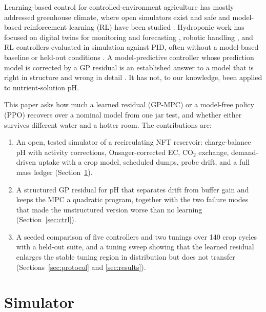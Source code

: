 \documentclass[11pt]{article}
\begin{document}
Learning-based control for controlled-environment agriculture has mostly addressed greenhouse climate, where open simulators exist \citep{vanhenten1994thesis,vanlaatum2025greenlightgym,zhu2026lettucevissim} and safe and model-based reinforcement learning (RL) have been studied \citep{zhang2021robustmbrl,liu2026safegreenhouse}. Hydroponic work has focused on digital twins for monitoring and forecasting \citep{janssingh2020dt,mayborne2026dt}, robotic handling \citep{fernandez2025digihortirobot,bashir2026harvest}, and RL controllers evaluated in simulation against PID, often without a model-based baseline or held-out conditions \citep{dakshinamurthy2025rlpid,goldenits2024rldt}. A model-predictive controller whose prediction model is corrected by a GP residual is an established answer to a model that is right in structure and wrong in detail \citep{ostafew2016lbnmpc,kabzan2019racing,hewing2020cautious,wang2023gpfblmpc,wang2026tutorial,scampicchio2025gpmpc}. It has not, to our knowledge, been applied to nutrient-solution pH.

This paper asks how much a learned residual (GP-MPC) or a model-free policy (PPO) recovers over a nominal model from one jar test, and whether either survives different water and a hotter room. The contributions are:
\begin{enumerate}
\item An open, tested simulator of a recirculating NFT reservoir: charge-balance pH with activity corrections, Onsager-corrected EC, CO$_2$ exchange, demand-driven uptake with a crop model, scheduled dumps, probe drift, and a full mass ledger (Section~\ref{sec:sim}).
\item A structured GP residual for pH that separates drift from buffer gain and keeps the MPC a quadratic program, together with the two failure modes that made the unstructured version worse than no learning (Section~\ref{sec:ctrl}).
\item A seeded comparison of five controllers and two tunings over 140 crop cycles with a held-out suite, and a tuning sweep showing that the learned residual enlarges the stable tuning region in distribution but does not transfer (Sections~\ref{sec:protocol} and \ref{sec:results}).
\end{enumerate}

\section{Simulator}\label{sec:sim}
\end{document}
